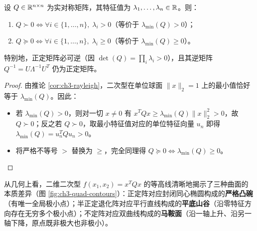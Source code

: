 \begin{thmBox}
\begin{theorem}[正定与半正定矩阵的特征值充要判据]
\label{thm:ch3-psd-eig}
设 $Q \in \mathbb{R}^{n\times n}$ 为实对称矩阵，其特征值为 $\lambda_1, \dots, \lambda_n \in \mathbb{R}$。则：
\begin{enumerate}
  \item $Q \succ 0 \iff \forall i \in \{1,\dots,n\},\; \lambda_i > 0$（等价于 $\lambda_{\min}(Q) > 0$）；
  \item $Q \succeq 0 \iff \forall i \in \{1,\dots,n\},\; \lambda_i \ge 0$（等价于 $\lambda_{\min}(Q) \ge 0$）。
\end{enumerate}
特别地，正定矩阵必可逆（因 $\det(Q) = \prod_i \lambda_i > 0$），且其逆矩阵 $Q^{-1} = U\Lambda^{-1}U^T$ 仍为正定矩阵。
\end{theorem}
\end{thmBox}

\begin{proof}
由推论 \ref{cor:ch3-rayleigh}，二次型在单位球面 $\|x\|_2 = 1$ 上的最小值恰好等于 $\lambda_{\min}(Q)$。因此：
\begin{itemize}
  \item 若 $\lambda_{\min}(Q) > 0$，则对一切 $x \neq 0$ 有 $x^T Q x \ge \lambda_{\min}(Q)\|x\|_2^2 > 0$，故 $Q \succ 0$；反之若 $Q \succ 0$，取最小特征值对应的单位特征向量 $u_n$ 即得 $\lambda_{\min}(Q) = u_n^T Q u_n > 0$。
  \item 将严格不等号 $>$ 替换为 $\ge$，完全同理得 $Q \succeq 0 \iff \lambda_{\min}(Q) \ge 0$。
\end{itemize}
\end{proof}

从几何上看，二维二次型 $f(x_1, x_2) = x^T Q x$ 的等高线清晰地揭示了三种曲面的本质差异（图 \ref{fig:ch3-quad-contours}）：正定阵对应封闭同心椭圆构成的\textbf{严格凸碗}（有唯一全局极小点）；半正定退化阵对应平行直线构成的\textbf{平底山谷}（沿零特征方向存在无穷多个极小点）；不定阵对应双曲线构成的\textbf{马鞍面}（沿一轴上升、沿另一轴下降，原点既非极大也非极小）。

